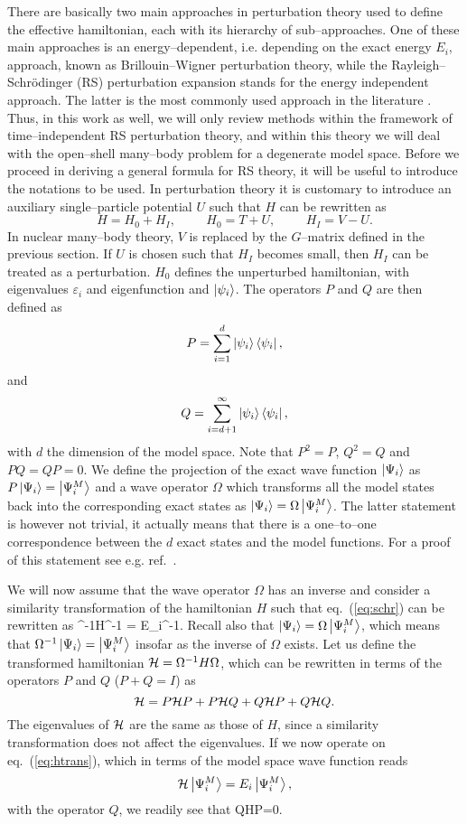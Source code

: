 There are basically two main approaches in perturbation theory used
to define the effective hamiltonian,
each with its hierarchy of sub--approaches. One of these main
approaches is an energy--dependent, i.e. depending on the
exact energy $E_i$, approach, known as Brillouin--Wigner
perturbation theory, while the Rayleigh--Schr\"{o}dinger (RS) perturbation
expansion stands for the energy independent approach. The latter is
the most commonly used approach in the literature \cite{ko90,lm85}.
Thus, in this work as well, we will only review methods within the framework
of time--independent RS perturbation theory, and within this
theory we will deal with the open--shell many--body
problem for a degenerate model space.
Before we proceed in deriving a general
formula for RS theory, it will be useful to introduce the notations
to be used.
In perturbation theory it is customary to introduce
an auxiliary single--particle potential $U$ such that $H$ can be rewritten
as
\[
H=H_0 + H_I, \hspace{1cm} H_0 = T+U, \hspace{1cm} H_I = V-U.
\]
In nuclear many--body theory, $V$ is replaced by the $G$--matrix
defined in the previous section. If $U$ is chosen such that
$H_I$ becomes small, then $H_I$ can be treated as a perturbation.
$H_0$ defines the unperturbed hamiltonian, with eigenvalues
$\varepsilon_i$ and eigenfunction  and $\left| \psi_i \right\rangle$.
The operators $P$ and $Q$ are then defined as
\[
P=\sum_{i=1}^{d}\left| \psi_i \right\rangle\left\langle \psi_i \right|,
\]
and
\[
Q=\sum_{i=d+1}^{\infty}\left| \psi_i \right\rangle\left\langle \psi_i \right|,
\]
with $d$ the dimension of the model space. Note that $P^2 =P$, $Q^2 =Q$
and $PQ=QP=0$.
We define the projection of the exact wave function $\left| \Psi_i \right\rangle$
as $P\left| \Psi_i \right\rangle=\left| \Psi_{i}^M \right\rangle$ and a wave operator $\Omega$
which transforms all the model states back into the corresponding
exact states as $\left| \Psi_i \right\rangle=\Omega\left| \Psi_{i}^M \right\rangle$.  The latter
statement is however not trivial, it actually means that there is
a one--to--one correspondence between  the $d$ exact states and the
model functions.
For a proof of this statement see e.g. ref.\ \cite{ko90}.

We will now assume that the wave operator $\Omega$ has an inverse and
consider a similarity transformation of the hamiltonian $H$ such that
eq.\ (\ref{eq:schr}) can be rewritten as
\be
\Omega^{-1}H\Omega\Omega^{-1} = E_i\Omega^{-1}.
\label{eq:htrans}
\ee
Recall also that $\left| \Psi_i \right\rangle= \Omega\left| \Psi_i^{M} \right\rangle$, which means that
 $\Omega^{-1}\left| \Psi_i \right\rangle = \left| \Psi_i^{M} \right\rangle$ insofar as the inverse of
 $\Omega$ exists. Let us define the transformed hamiltonian ${\cal H}
 =\Omega^{-1}H\Omega$, which can be rewritten in terms of the
operators $P$ and $Q$ ($P+Q=I$) as
\[
{\cal H}=P{\cal H}P+P{\cal H}Q+Q{\cal H}P+Q{\cal H}Q.
\]
The eigenvalues of ${\cal H}$ are the same as those of $H$, since a
similarity transformation does not affect the eigenvalues.
If we now operate  on eq.\ (\ref{eq:htrans}), which in terms of the model
space wave function reads
\[
{\cal H}\left| \Psi_i^{M} \right\rangle = E_i\left| \Psi_i^{M} \right\rangle,
\]
with the operator $Q$, we readily see that
\be
Q{\cal H}P=0.\label{eq:qhp}
\ee


